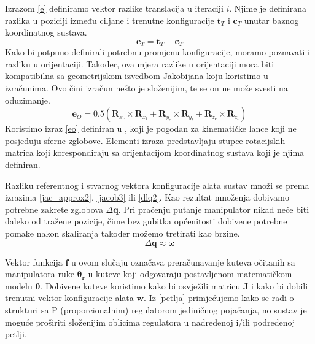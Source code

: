 \documentclass[times, utf8, diplomski, numeric]{fer}
\begin{document}
Izrazom \ref{e} definiramo vektor razlike translacija u iteraciji $i$. Njime je definirana razlika u poziciji između ciljane i trenutne konfiguracije ${\mathbf{t}_{T}}$ i ${\mathbf{c}_{T}}$ unutar baznog koordinatnog sustava.
\begin{equation}
{\mathbf{e}_{T}} = {\mathbf{t}_{T}} -{\mathbf{c}_{T}}
\label{e}
\end{equation}
Kako bi potpuno definirali potrebnu promjenu konfiguracije, moramo poznavati i razliku u orijentaciji.
Također, ova mjera razlike u orijentaciji mora biti kompatibilna sa geometrijskom izvedbom Jakobijana koju koristimo u izračunima.
Ovo čini izračun nešto je složenijim, te se on ne može svesti na oduzimanje.
\begin{equation}
{\mathbf{e}_{O}} = 0.5\left(\mathbf{R}_{x_c}\times\mathbf{R}_{x_t} + \mathbf{R}_{y_c}\times\mathbf{R}_{y_t} + \mathbf{R}_{z_c}\times\mathbf{R}_{z_t}\right)
\label{eo}
\end{equation}
Koristimo izraz \ref{eo} definiran u \cite{siciliano2010robotics}, koji je pogodan za kinematičke lance koji ne posjeduju sferne zglobove.
Elementi izraza predstavljaju stupce rotacijskih matrica koji korespondiraju sa orijentacijom koordinatnog sustava koji je njima definiran.

Razliku referentnog i stvarnog vektora konfiguracije alata sustav množi se prema izrazima \ref{jac_approx2}, \ref{jacob3} ili \ref{dlq2}.
Kao rezultat množenja dobivamo potrebne zakrete zglobova $\Delta \mathbf{q}$.
Pri praćenju putanje manipulator nikad neće biti daleko od tražene pozicije, čime bez gubitka općenitosti dobivene potrebne pomake nakon skaliranja također možemo tretirati kao brzine.
\begin{equation}
\Delta \mathbf{q} \approx \bm{\omega}
\end{equation}

Vektor funkcija $\mathbf{f}$ u ovom slučaju označava preračunavanje kuteva očitanih sa manipulatora ruke $\bm{\theta_r}$ u kuteve koji odgovaraju postavljenom matematičkom modelu $\bm{\theta}$. 
Dobivene kuteve koristimo kako bi osvježili matricu $\mathbf{J}$ i kako bi dobili trenutni vektor konfiguracije alata $\mathbf{w}$. 
Iz \ref{petlja} primjećujemo kako se radi o strukturi sa P (proporcionalnim) regulatorom jediničnog pojačanja, no sustav je moguće proširiti složenijim oblicima regulatora u nadređenoj i/ili podređenoj petlji.
\end{document}
